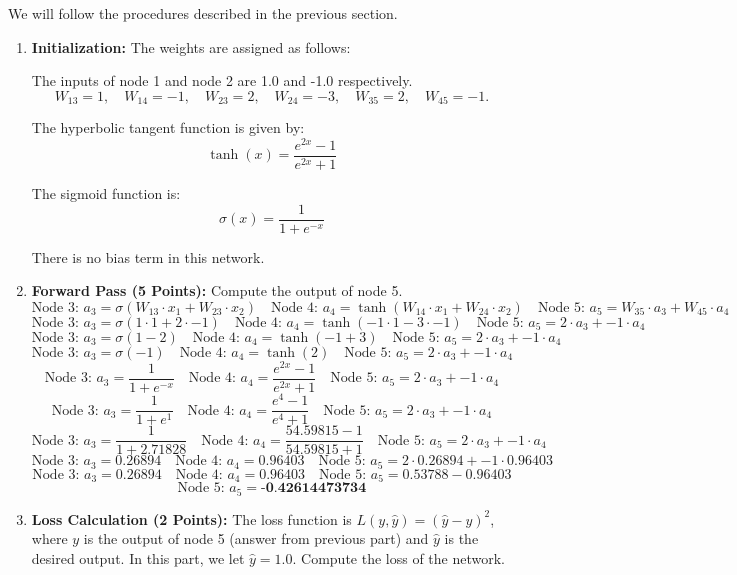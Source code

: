 \documentclass{article}
\begin{document}
We will follow the procedures described in the previous section.

\begin{enumerate}
\item \textbf{Initialization: } 
The weights are assigned as follows:


The inputs of node 1 and node 2 are 1.0 and -1.0 respectively.
\[
W_{13} = 1, \quad W_{14} = -1, \quad W_{23} = 2, \quad W_{24} = -3, \quad W_{35} = 2, \quad W_{45} = -1.
\]

The hyperbolic tangent function is given by:
\[
\tanh(x) = \frac{e^{2x} - 1}{e^{2x} + 1}
\]

The sigmoid function is:
\[
\sigma(x) = \frac{1}{1 + e^{-x}}
\]

There is no bias term in this network.


    \item \textbf{Forward Pass (5 Points):} Compute the output of node 5.
    \[
    \text{Node 3: } a_3 = \sigma(W_{13} \cdot x_1 + W_{23} \cdot x_2) \quad \text{Node 4: } a_4 = \tanh(W_{14} \cdot x_1 + W_{24} \cdot x_2) \quad \text{Node 5: } a_5 = W_{35} \cdot a_3 + W_{45} \cdot a_4
    \]
    \[
    \text{Node 3: } a_3 = \sigma(1 \cdot 1 + 2 \cdot -1) \quad \text{Node 4: } a_4 = \tanh(-1 \cdot 1 - 3 \cdot -1) \quad \text{Node 5: } a_5 = 2 \cdot a_3 + -1 \cdot a_4
    \]
    \[
    \text{Node 3: } a_3 = \sigma(1 - 2) \quad \text{Node 4: } a_4 = \tanh(-1 + 3) \quad \text{Node 5: } a_5 = 2 \cdot a_3 + -1 \cdot a_4
    \]
    \[
    \text{Node 3: } a_3 = \sigma(-1) \quad \text{Node 4: } a_4 = \tanh(2) \quad \text{Node 5: } a_5 = 2 \cdot a_3 + -1 \cdot a_4
    \]
    \[
    \text{Node 3: } a_3 = \frac{1}{1 + e^{-x}} \quad \text{Node 4: } a_4 = \frac{e^{2x} - 1}{e^{2x} + 1} \quad \text{Node 5: } a_5 = 2 \cdot a_3 + -1 \cdot a_4
    \]
    \[
    \text{Node 3: } a_3 = \frac{1}{1 + e^{1}} \quad \text{Node 4: } a_4 = \frac{e^{4} - 1}{e^{4} + 1} \quad \text{Node 5: } a_5 = 2 \cdot a_3 + -1 \cdot a_4
    \]
    \[
    \text{Node 3: } a_3 = \frac{1}{1 + 2.71828} \quad \text{Node 4: } a_4 = \frac{54.59815 - 1}{54.59815 + 1} \quad \text{Node 5: } a_5 = 2 \cdot a_3 + -1 \cdot a_4
    \]
    \[
    \text{Node 3: } a_3 = 0.26894 \quad \text{Node 4: } a_4 = 0.96403 \quad \text{Node 5: } a_5 = 2 \cdot 0.26894 + -1 \cdot 0.96403
    \]
    \[
    \text{Node 3: } a_3 = 0.26894 \quad \text{Node 4: } a_4 = 0.96403 \quad \text{Node 5: } a_5 = 0.53788 - 0.96403
    \]
    \[
     \text{Node 5: } a_5 = \textbf{-0.42614473734}
    \]
    \item \textbf{Loss Calculation (2 Points):} The loss function is $L(y, \hat{y}) = (\hat{y} - y)^2$, where $y$ is the output of node 5 (answer from previous part) and $\hat{y}$ is the desired output. In this part, we let $\hat{y} = 1.0$. Compute the loss of the network.

\end{enumerate}
\end{document}
